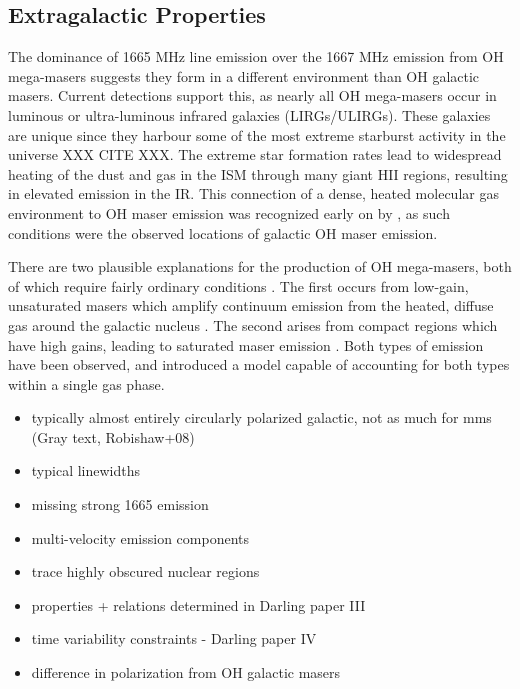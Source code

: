 \subsection{Extragalactic Properties}
\label{sub:oh_gal_props}

The dominance of 1665 MHz line emission over the 1667 MHz emission from OH mega-masers suggests they form in a different environment than OH galactic masers. Current detections support this, as nearly all OH mega-masers occur in luminous or ultra-luminous infrared galaxies (LIRGs/ULIRGs). These galaxies are unique since they harbour some of the most extreme starburst activity in the universe XXX CITE XXX. The extreme star formation rates lead to widespread heating of the dust and gas in the ISM through many giant HII regions, resulting in elevated emission in the IR. This connection of a dense, heated molecular gas environment to OH maser emission was recognized early on by \cite{Bottinelli_1987}, as such conditions were the observed locations of galactic OH maser emission. 

There are two plausible explanations for the production of OH mega-masers, both of which require fairly ordinary conditions \citep{lo2005}. The first occurs from low-gain, unsaturated masers which amplify continuum emission from the heated, diffuse gas around the galactic nucleus \citep[e.g.]{Baan_1985}. The second arises from compact regions which have high gains, leading to saturated maser emission \citep[e.g.,]{lonsdale2002}. Both types of emission have been observed, and \citet{Parra_2005} introduced a model capable of accounting for both types within a single gas phase.

\begin{itemize}
\item typically almost entirely circularly polarized galactic, not as much for mms (Gray text, Robishaw+08) 
\item typical linewidths 
\item missing strong 1665 emission
\item multi-velocity emission components
\item trace highly obscured nuclear regions
\item properties + relations determined in Darling paper III
\item time variability constraints - Darling paper IV
\item difference in polarization from OH galactic masers
\end{itemize}

